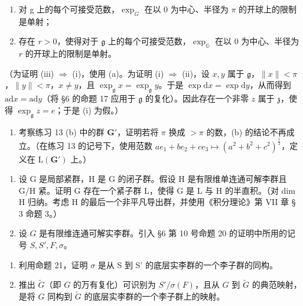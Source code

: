 \begin{enumerate}
\def\labelenumi{(\roman{enumi})}
\setcounter{enumi}{1}
\item
  对 g 上的每个可接受范数，\(\exp_{G}\) 在以 0 为中心、半径为 \(\pi\) 的开球上的限制是单射；
\item
  存在 \(r > 0\)，使得对于 \(\mathfrak{g}\) 上的每个可接受范数，\(\exp_{\mathbb{G}}\) 在以 0 为中心、半径为 \(r\) 的开球上的限制是单射。
\end{enumerate}

（为证明 (iii) \(\Rightarrow\) (i)，使用 (a)。为证明 (i) \(\Rightarrow\) (ii)，设 \(x, y\) 属于 \(\mathfrak{g}\)，\(\| x \| < \pi\)，\(\| y \| < \pi\)，\(x \neq y\)，且 \(\exp_{\mathfrak{g}} x = \exp_{\mathfrak{g}} y\)。于是 \(\exp \mathrm{d} x = \exp \mathrm{d} y\)，从而得到 \(\mathrm{ad} x = \mathrm{ad} y\)（将 §6 的命题 17 应用于 \(\mathfrak{g}\) 的复化）。因此存在一个非零 \(z\) 属于 \(\mathfrak{z}\)，使得 \(\exp_{\mathfrak{g}} z = e\)；于是 (i) 为假。）

\begin{enumerate}
\def\labelenumi{(\alph{enumi})}
\setcounter{enumi}{2}
\tightlist
\item
  考察练习 13 (b) 中的群 \(\mathbf{G}'\)，证明若将 \(\pi\) 换成 \(> \pi\) 的数，(b) 的结论不再成立。（在练习 13 的记号下，使用范数 \(ae_{1} + be_{2} + ce_{3} \mapsto (a^{2} + b^{2} + c^{2})^{\frac{1}{2}}\)，定义在 \(\mathrm{L}(\mathbf{G}')\) 上。）
\end{enumerate}

\begin{enumerate}
\def\labelenumi{\arabic{enumi}.}
\setcounter{enumi}{18}
\item
  设 G 是局部紧群，H 是 G 的闭子群。假设 H 是有限维单连通可解李群且 G/H 紧。证明 G 存在一个紧子群 L，使得 G 是 L 与 H 的半直积。（对 dim H 归纳。考虑 H 的最后一个非平凡导出群，并使用《积分理论》第 VII 章 § 3 命题 3。）
\item
  设 \(G\) 是有限维连通可解实李群。引入 §6 第 10 号命题 20 的证明中所用的记号 \(S, S', F, \sigma\)。
\end{enumerate}

\begin{enumerate}
\def\labelenumi{(\alph{enumi})}
\item
  利用命题 21，证明 \(\sigma\) 是从 S 到 S' 的底层实李群的一个李子群的同构。
\item
  推出 \(\tilde{G}\)（即 \(G\) 的万有复化）可识别为 \(S' / \sigma(F)\)，且从 \(G\) 到 \(\tilde{G}\) 的典范映射，是将 \(G\) 同构到 \(\tilde{G}\) 的底层实李群的一个李子群上的映射。
\end{enumerate}

